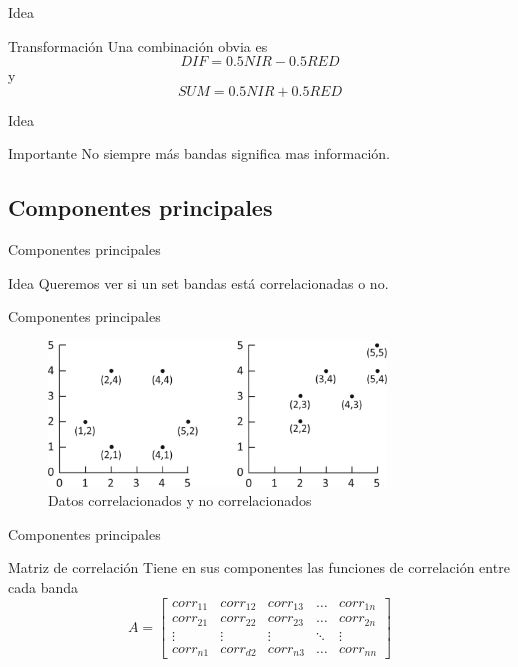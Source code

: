 \documentclass[handout]{beamer}
\begin{document}
\begin{frame}{Idea}
  \begin{alertblock}{Transformaci\'on}
    Una combinaci\'on obvia es $$ DIF = 0.5NIR-0.5RED$$
    y
    $$ SUM = 0.5NIR+0.5RED $$
  \end{alertblock}
\end{frame}


\begin{frame}{Idea}
  \begin{alertblock}{Importante}
    No siempre m\'as bandas significa mas informaci\'on.
  \end{alertblock}
\end{frame}

\subsection{Componentes principales}

\begin{frame}{Componentes principales}
  \begin{block}{Idea}
    Queremos ver si un set bandas est\'a correlacionadas o no.
  \end{block}
\end{frame}

\begin{frame}{Componentes principales}
  \begin{figure}
  \centering
  \includegraphics[width=0.8\textwidth]{imagenes/corr.png}
  \caption{Datos correlacionados y no correlacionados}
  \end{figure}
\end{frame}



\begin{frame}{Componentes principales}
  \begin{block}{Matriz de correlaci\'on}
    Tiene en sus componentes las funciones de correlaci\'on entre cada banda\pause
    \[
    A = \begin{bmatrix}
        corr_{11}       & corr_{12} & corr_{13} & \dots & corr_{1n} \\
        corr_{21}       & corr_{22} & corr_{23} & \dots & corr_{2n} \\
        \vdots          & \vdots    & \vdots    & \ddots & \vdots \\
        corr_{n1}       & corr_{d2} & corr_{n3} & \dots & corr_{nn}
    \end{bmatrix} \]
  \end{block}
\end{frame}
\end{document}
